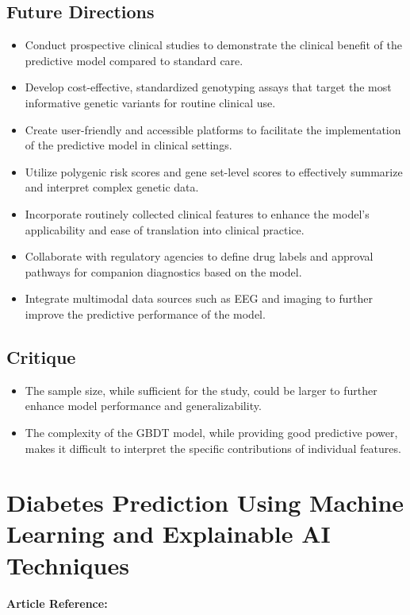 \subsection*{Future Directions}
\begin{itemize}
    \item Conduct prospective clinical studies to demonstrate the clinical benefit of the predictive model compared to standard care.
    \item Develop cost-effective, standardized genotyping assays that target the most informative genetic variants for routine clinical use.
    \item Create user-friendly and accessible platforms to facilitate the implementation of the predictive model in clinical settings.
    \item Utilize polygenic risk scores and gene set-level scores to effectively summarize and interpret complex genetic data.
    \item Incorporate routinely collected clinical features to enhance the model’s applicability and ease of translation into clinical practice.
    \item Collaborate with regulatory agencies to define drug labels and approval pathways for companion diagnostics based on the model.
    \item Integrate multimodal data sources such as EEG and imaging to further improve the predictive performance of the model.
\end{itemize}
\subsection*{Critique}
\begin{itemize}
    \item The sample size, while sufficient for the study, could be larger to further enhance model performance and generalizability. 
    \item The complexity of the GBDT model, while providing good predictive power, makes it difficult to interpret the specific contributions of individual features.
    
\end{itemize}

\section{Diabetes Prediction Using Machine Learning and Explainable AI Techniques}
\textbf{Article Reference:} \cite{tasinDiabetesPredictionUsing2023}

